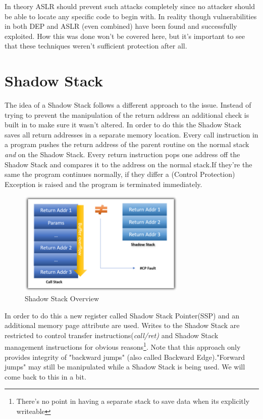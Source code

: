 \documentclass[10pt,twocolumn,a4paper]{article}
\begin{document}
\newline
In theory ASLR should prevent such attacks completely since no attacker should be able to locate any specific code to begin with.
In reality though vulnerabilities in both DEP and ASLR (even combined) have been found and successfully exploited.
How this was done won't be covered here, but it's important to see that these techniques weren't sufficient protection after all.

\section{Shadow Stack}\label{shadowstack}
The idea of a Shadow Stack follows a different approach to the issue.
Instead of trying to prevent the manipulation of the return address an additional check is built in to make sure it wasn't altered.
In order to do this the Shadow Stack saves all return addresses in a separate memory location.
Every call instruction in a program pushes the return address of the parent routine on the normal stack \emph{and} on the Shadow Stack.
Every return instruction pops one address off the Shadow Stack and compares it to the address on the normal stack.If they're the same the program continues normally, if they differ a (Control Protection) Exception is raised and the program is terminated immediately.
\begin{figure}[h]
\includegraphics[keepaspectratio,width=8cm]{fig/Shadow Stack}
\caption{Shadow Stack Overview}
\end{figure}
\newline
In order to do this a new register called Shadow Stack Pointer(SSP) and an additional memory page attribute are used.
Writes to the Shadow Stack are restricted to control transfer instructions(\emph{call/ret)} and Shadow Stack management instructions for obvious reasons\footnote{There's no point in having a separate stack to save data when its explicitly writeable}.
Note that this approach only provides integrity of "backward jumps" (also called Backward Edge)."Forward jumps" may still be manipulated while a Shadow Stack is being used. We will come back to this in a bit.
\end{document}
